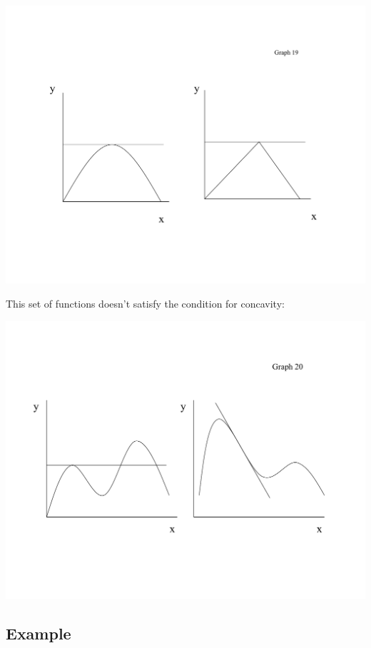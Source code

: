 \documentclass[11pt,english]{article}
\begin{document}
\begin{center}
\includegraphics[scale=0.6]{math5.pdf}

This set of functions doesn't satisfy the condition for concavity:

\includegraphics[scale=0.6]{math6.pdf}

\end{center}

\bigskip



\subsection{Example}
\end{document}
